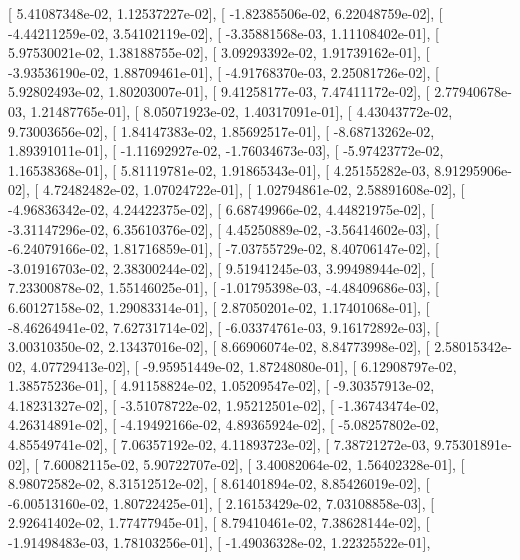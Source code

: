 \documentclass{article}
\begin{document}
       [  5.41087348e-02,   1.12537227e-02],
       [ -1.82385506e-02,   6.22048759e-02],
       [ -4.44211259e-02,   3.54102119e-02],
       [ -3.35881568e-03,   1.11108402e-01],
       [  5.97530021e-02,   1.38188755e-02],
       [  3.09293392e-02,   1.91739162e-01],
       [ -3.93536190e-02,   1.88709461e-01],
       [ -4.91768370e-03,   2.25081726e-02],
       [  5.92802493e-02,   1.80203007e-01],
       [  9.41258177e-03,   7.47411172e-02],
       [  2.77940678e-03,   1.21487765e-01],
       [  8.05071923e-02,   1.40317091e-01],
       [  4.43043772e-02,   9.73003656e-02],
       [  1.84147383e-02,   1.85692517e-01],
       [ -8.68713262e-02,   1.89391011e-01],
       [ -1.11692927e-02,  -1.76034673e-03],
       [ -5.97423772e-02,   1.16538368e-01],
       [  5.81119781e-02,   1.91865343e-01],
       [  4.25155282e-03,   8.91295906e-02],
       [  4.72482482e-02,   1.07024722e-01],
       [  1.02794861e-02,   2.58891608e-02],
       [ -4.96836342e-02,   4.24422375e-02],
       [  6.68749966e-02,   4.44821975e-02],
       [ -3.31147296e-02,   6.35610376e-02],
       [  4.45250889e-02,  -3.56414602e-03],
       [ -6.24079166e-02,   1.81716859e-01],
       [ -7.03755729e-02,   8.40706147e-02],
       [ -3.01916703e-02,   2.38300244e-02],
       [  9.51941245e-03,   3.99498944e-02],
       [  7.23300878e-02,   1.55146025e-01],
       [ -1.01795398e-03,  -4.48409686e-03],
       [  6.60127158e-02,   1.29083314e-01],
       [  2.87050201e-02,   1.17401068e-01],
       [ -8.46264941e-02,   7.62731714e-02],
       [ -6.03374761e-03,   9.16172892e-03],
       [  3.00310350e-02,   2.13437016e-02],
       [  8.66906074e-02,   8.84773998e-02],
       [  2.58015342e-02,   4.07729413e-02],
       [ -9.95951449e-02,   1.87248080e-01],
       [  6.12908797e-02,   1.38575236e-01],
       [  4.91158824e-02,   1.05209547e-02],
       [ -9.30357913e-02,   4.18231327e-02],
       [ -3.51078722e-02,   1.95212501e-02],
       [ -1.36743474e-02,   4.26314891e-02],
       [ -4.19492166e-02,   4.89365924e-02],
       [ -5.08257802e-02,   4.85549741e-02],
       [  7.06357192e-02,   4.11893723e-02],
       [  7.38721272e-03,   9.75301891e-02],
       [  7.60082115e-02,   5.90722707e-02],
       [  3.40082064e-02,   1.56402328e-01],
       [  8.98072582e-02,   8.31512512e-02],
       [  8.61401894e-02,   8.85426019e-02],
       [ -6.00513160e-02,   1.80722425e-01],
       [  2.16153429e-02,   7.03108858e-03],
       [  2.92641402e-02,   1.77477945e-01],
       [  8.79410461e-02,   7.38628144e-02],
       [ -1.91498483e-03,   1.78103256e-01],
       [ -1.49036328e-02,   1.22325522e-01],
\end{document}
